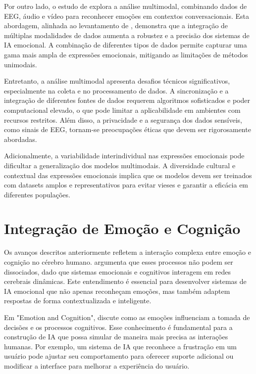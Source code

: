 \documentclass[a4paper,12pt]{report}
\begin{document}
	Por outro lado, o estudo de \textcite{lee2024} explora a análise multimodal, combinando dados de EEG, áudio e vídeo para reconhecer emoções em contextos conversacionais. Esta abordagem, alinhada ao levantamento de \textcite{poria2015}, demonstra que a integração de múltiplas modalidades de dados aumenta a robustez e a precisão dos sistemas de IA emocional. A combinação de diferentes tipos de dados permite capturar uma gama mais ampla de expressões emocionais, mitigando as limitações de métodos unimodais.
	
	Entretanto, a análise multimodal apresenta desafios técnicos significativos, especialmente na coleta e no processamento de dados. A sincronização e a integração de diferentes fontes de dados requerem algoritmos sofisticados e poder computacional elevado, o que pode limitar a aplicabilidade em ambientes com recursos restritos. Além disso, a privacidade e a segurança dos dados sensíveis, como sinais de EEG, tornam-se preocupações éticas que devem ser rigorosamente abordadas.
	
	Adicionalmente, a variabilidade interindividual nas expressões emocionais pode dificultar a generalização dos modelos multimodais. A diversidade cultural e contextual das expressões emocionais implica que os modelos devem ser treinados com datasets amplos e representativos para evitar vieses e garantir a eficácia em diferentes populações.
	
	
	\section{Integração de Emoção e Cognição}
	
	Os avanços descritos anteriormente refletem a interação complexa entre emoção e cognição no cérebro humano. \textcite{pessoa2013} argumenta que esses processos não podem ser dissociados, dado que sistemas emocionais e cognitivos interagem em redes cerebrais dinâmicas. Este entendimento é essencial para desenvolver sistemas de IA emocional que não apenas reconheçam emoções, mas também adaptem respostas de forma contextualizada e inteligente.
	
	Em "Emotion and Cognition", \textcite{pessoa2013} discute como as emoções influenciam a tomada de decisões e os processos cognitivos. Esse conhecimento é fundamental para a construção de IA que possa simular de maneira mais precisa as interações humanas. Por exemplo, um sistema de IA que reconhece a frustração em um usuário pode ajustar seu comportamento para oferecer suporte adicional ou modificar a interface para melhorar a experiência do usuário.
	
\end{document}

